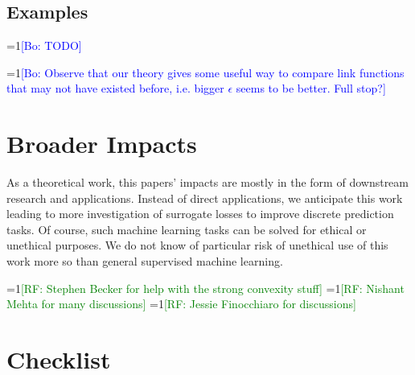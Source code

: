 \documentclass{article}
\theoremstyle{definition}\newtheorem{definition}{Definition}
\theoremstyle{definition}\newtheorem{assumption}{Assumption}
\newcommand{\Comments}{1}
\newcommand{\mynote}[2]{\ifnum\Comments=1\textcolor{#1}{#2}\fi}
\newcommand{\raf}[1]{\mynote{green}{[RF: #1]}}
\newcommand{\bo}[1]{\mynote{blue}{[Bo: #1]}}
\begin{document}
\subsection{Examples}
\bo{TODO}

\bo{Observe that our theory gives some useful way to compare link functions that may not have existed before, i.e. bigger $\epsilon$ seems to be better. Full stop?}


\section{Broader Impacts}
As a theoretical work, this papers' impacts are mostly in the form of downstream research and applications.
Instead of direct applications, we anticipate this work leading to more investigation of surrogate losses to improve discrete prediction tasks.
Of course, such machine learning tasks can be solved for ethical or unethical purposes.
We do not know of particular risk of unethical use of this work more so than general supervised machine learning.




\begin{ack}
  \raf{Stephen Becker for help with the strong convexity stuff}
  \raf{Nishant Mehta for many discussions}
  \raf{Jessie Finocchiaro for discussions}
\end{ack}





\section*{Checklist}
\end{document}
